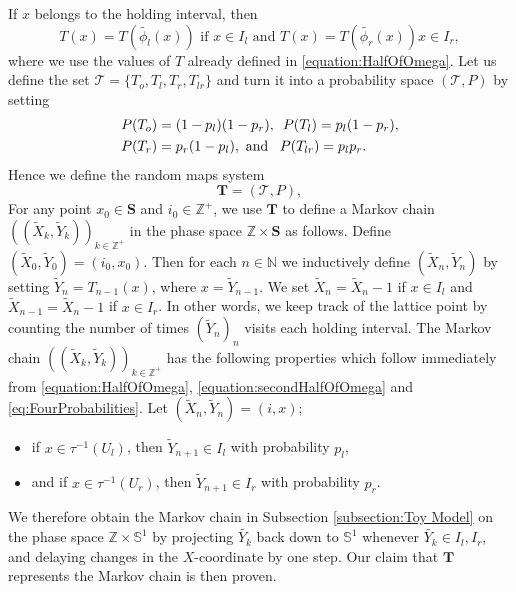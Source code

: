\documentclass[pdftex,11pt,a4paper,oneside]{article}
\theoremstyle{plain}
\begin{document}
If $x$ belongs to the holding interval, then 
\begin{equation}\label{equation:secondHalfOfOmega}
     T(x) = T(\tilde{\phi_l}(x)) \text{ if } x\in I_l \text{ and }
        T(x) =  T(\tilde{\phi_r}(x)) x\in I_r,
\end{equation}
where we use the values of $T$ already defined in \eqref{equation:HalfOfOmega}. Let us define the set $\mathcal{T} = \{T_{o},T_l,T_r,T_{lr}\}$ and turn it into a probability space $(\mathcal{T},P)$ by setting
\begin{equation}\label{eq:FourProbabilities}
    \begin{split}
        &P(T_{o}) =(1-p_l)(1-p_r),\enskip P(T_l) = p_l(1-p_r),\\
        &P(T_r) = p_r(1-p_l), \text{ and } \enskip P(T_{lr}) = p_lp_r.
    \end{split}
\end{equation}
Hence we define the random maps system
\[\mathbf{T} =  (\mathcal{T},P),\]
For any point $x_0\in \mathbf{S}$ and $i_0\in\mathbb{Z}^+$, we use $\mathbf{T}$ to define a Markov chain $\left((\tilde{X}_k,\tilde{Y}_k)\right)_{k\in\mathbb{Z}^+}$ in the phase space $\mathbb{Z}\times\mathbf{S}$ as follows. Define $(\tilde{X}_0,\tilde{Y}_0) = (i_0,x_0)$. Then for each $n\in\mathbb{N}$ we inductively define $(\tilde{X}_n,\tilde{Y}_n)$ by setting $\tilde{Y}_n = T_{n-1}\left(x\right)$, where $x=\tilde{Y}_{n-1}$. We  set $\tilde{X}_n = \tilde{X}_n - 1$ if $x\in I_l$ and $\tilde{X}_{n-1} = \tilde{X}_n - 1$ if $x\in I_r$. In other words, we keep track of the lattice point by counting the number of times $(\tilde{Y}_n)_n$ visits each holding interval. The Markov chain $\left((\tilde{X}_k,\tilde{Y}_k)\right)_{k\in\mathbb{Z}^+}$ has the following properties which follow immediately from \eqref{equation:HalfOfOmega},  \eqref{equation:secondHalfOfOmega} and \eqref{eq:FourProbabilities}. Let $(\tilde{X}_n,\tilde{Y}_n) = (i,x)$;
\begin{itemize}
    \item if $x\in \tau^{-1}(U_l)$, then $\tilde{Y}_{n+1} \in I_l$ with probability $p_l$,
    \item and if $x\in \tau^{-1}(U_r)$, then $\tilde{Y}_{n+1} \in I_r$ with probability $p_r$.
\end{itemize}
We therefore obtain the Markov chain in Subsection \ref{subsection:Toy Model} on the phase space $\mathbb{Z}\times \mathbb{S}^1$ by projecting $\tilde{Y_k}$ back down to $\mathbb{S}^1$ whenever $\tilde{Y_k}\in I_l,I_r$, and delaying changes in the $X$-coordinate by one step.
Our claim that $\mathbf{T}$ represents the Markov chain is then proven. 
\end{document}
